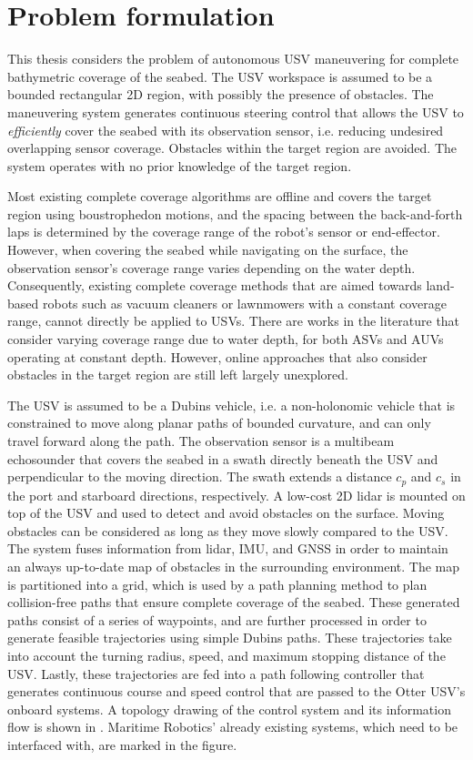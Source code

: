 \chapter{Problem formulation}

This thesis considers the problem of autonomous USV maneuvering for complete bathymetric coverage of the seabed. The USV workspace is assumed to be a bounded rectangular 2D region, with possibly the presence of obstacles. The maneuvering system generates continuous steering control that allows the USV to \emph{efficiently} cover the seabed with its observation sensor, i.e. reducing undesired overlapping sensor coverage. Obstacles within the target region are avoided. The system operates with no prior knowledge of the target region.

Most existing complete coverage algorithms are offline and covers the target region using boustrophedon motions, and the spacing between the back-and-forth laps is determined by the coverage range of the robot's sensor or end-effector. However, when covering the seabed while navigating on the surface, the observation sensor's coverage range varies depending on the water depth. Consequently, existing complete coverage methods that are aimed towards land-based robots such as vacuum cleaners or lawnmowers with a constant coverage range, cannot directly be applied to USVs. There are works in the literature that consider varying coverage range due to water depth, for both ASVs and AUVs operating at constant depth. However, online approaches that also consider obstacles in the target region are still left largely unexplored.

The USV is assumed to be a Dubins vehicle, i.e. a non-holonomic vehicle that is constrained to move along planar paths of bounded curvature, and can only travel forward along the path. The observation sensor is a multibeam echosounder that covers the seabed in a swath directly beneath the USV and perpendicular to the moving direction. The swath extends a distance $c_p$ and $c_s$ in the port and starboard directions, respectively. A low-cost 2D lidar is mounted on top of the USV and used to detect and avoid obstacles on the surface. Moving obstacles can be considered as long as they move slowly compared to the USV. The system fuses information from lidar, IMU, and GNSS in order to maintain an always up-to-date map of obstacles in the surrounding environment. The map is partitioned into a grid, which is used by a path planning method to plan collision-free paths that ensure complete coverage of the seabed. These generated paths consist of a series of waypoints, and are further processed in order to generate feasible trajectories using simple Dubins paths. These trajectories take into account the turning radius, speed, and maximum stopping distance of the USV. Lastly, these trajectories are fed into a path following controller that generates continuous course and speed control that are passed to the Otter USV's onboard systems. A topology drawing of the control system and its information flow is shown in . Maritime Robotics' already existing systems, which need to be interfaced with, are marked in the figure.

